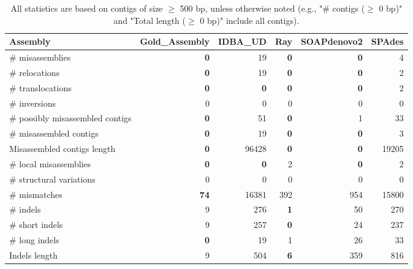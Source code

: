 \documentclass[12pt,a4paper]{article}
\begin{document}
\begin{table}[ht]
\begin{center}
\caption{All statistics are based on contigs of size $\geq$ 500 bp, unless otherwise noted (e.g., "\# contigs ($\geq$ 0 bp)" and "Total length ($\geq$ 0 bp)" include all contigs).}
\begin{tabular}{|l*{5}{|r}|}
\hline
Assembly & Gold\_Assembly & IDBA\_UD & Ray & SOAPdenovo2 & SPAdes \\ \hline
\# misassemblies & {\bf 0} & 19 & {\bf 0} & {\bf 0} & 4 \\ \hline
\hspace{5mm}\# relocations & {\bf 0} & 19 & {\bf 0} & {\bf 0} & 2 \\ \hline
\hspace{5mm}\# translocations & {\bf 0} & {\bf 0} & {\bf 0} & {\bf 0} & 2 \\ \hline
\hspace{5mm}\# inversions & 0 & 0 & 0 & 0 & 0 \\ \hline
\# possibly misassembled contigs & {\bf 0} & 51 & {\bf 0} & 1 & 33 \\ \hline
\# misassembled contigs & {\bf 0} & 19 & {\bf 0} & {\bf 0} & 3 \\ \hline
Misassembled contigs length & {\bf 0} & 96428 & {\bf 0} & {\bf 0} & 19205 \\ \hline
\# local misassemblies & {\bf 0} & {\bf 0} & 2 & {\bf 0} & 2 \\ \hline
\# structural variations & 0 & 0 & 0 & 0 & 0 \\ \hline
\# mismatches & {\bf 74} & 16381 & 392 & 954 & 15800 \\ \hline
\# indels & 9 & 276 & {\bf 1} & 50 & 270 \\ \hline
\hspace{5mm}\# short indels & 9 & 257 & {\bf 0} & 24 & 237 \\ \hline
\hspace{5mm}\# long indels & {\bf 0} & 19 & 1 & 26 & 33 \\ \hline
Indels length & 9 & 504 & {\bf 6} & 359 & 816 \\ \hline
\end{tabular}
\end{center}
\end{table}
\end{document}
